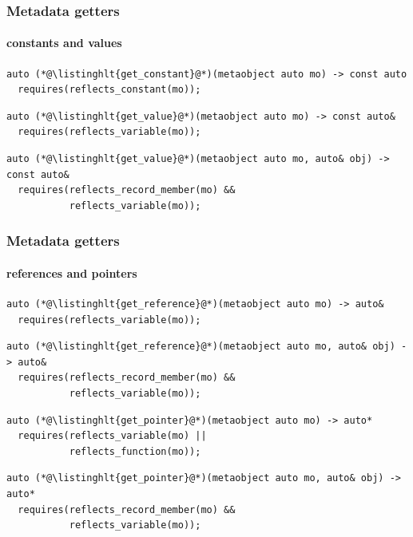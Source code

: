 \documentclass[aspectratio=169,compress,table,xcolor=table]{beamer}
\begin{document}
\begin{frame}[fragile]
  \frametitle{Metadata getters}
  \framesubtitle{constants and values}
  \begin{lstlisting}[language=c++2x,basicstyle=\small\ttfamily]
auto (*@\listinghlt{get_constant}@*)(metaobject auto mo) -> const auto
  requires(reflects_constant(mo));
  \end{lstlisting}
  \vfill
  \begin{lstlisting}[language=c++2x,basicstyle=\small\ttfamily]
auto (*@\listinghlt{get_value}@*)(metaobject auto mo) -> const auto&
  requires(reflects_variable(mo));
  \end{lstlisting}
  \vfill
  \begin{lstlisting}[language=c++2x,basicstyle=\small\ttfamily]
auto (*@\listinghlt{get_value}@*)(metaobject auto mo, auto& obj) -> const auto&
  requires(reflects_record_member(mo) &&
           reflects_variable(mo));
  \end{lstlisting}
\end{frame}
\begin{frame}[fragile]
  \frametitle{Metadata getters}
  \framesubtitle{references and pointers}
  \begin{lstlisting}[language=c++2x,basicstyle=\footnotesize\ttfamily]
auto (*@\listinghlt{get_reference}@*)(metaobject auto mo) -> auto&
  requires(reflects_variable(mo));
  \end{lstlisting}
  \vfill
  \begin{lstlisting}[language=c++2x,basicstyle=\footnotesize\ttfamily]
auto (*@\listinghlt{get_reference}@*)(metaobject auto mo, auto& obj) -> auto&
  requires(reflects_record_member(mo) &&
           reflects_variable(mo));
  \end{lstlisting}
  \vfill
  \begin{lstlisting}[language=c++2x,basicstyle=\footnotesize\ttfamily]
auto (*@\listinghlt{get_pointer}@*)(metaobject auto mo) -> auto*
  requires(reflects_variable(mo) ||
           reflects_function(mo));
  \end{lstlisting}
  \vfill
  \begin{lstlisting}[language=c++2x,basicstyle=\footnotesize\ttfamily]
auto (*@\listinghlt{get_pointer}@*)(metaobject auto mo, auto& obj) -> auto*
  requires(reflects_record_member(mo) &&
           reflects_variable(mo));
  \end{lstlisting}
\end{frame}
\end{document}
